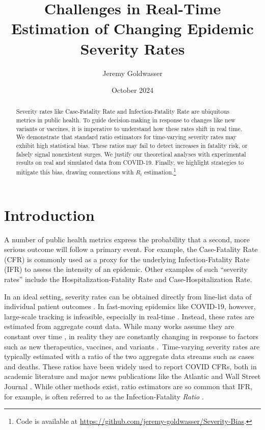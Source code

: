 \documentclass{article}
\title{Challenges in Real-Time Estimation of Changing Epidemic Severity Rates}
\author{Jeremy Goldwasser}
\date{October 2024}
\begin{document}
\maketitle
\begin{abstract}
    Severity rates like Case-Fatality Rate and Infection-Fatality Rate are ubiquitous metrics in public health. To guide decision-making in response to changes like new variants or vaccines, it is imperative to understand how these rates shift in real time. We demonstrate that standard ratio estimators for time-varying severity rates may exhibit high statistical bias. These ratios may fail to detect increases in fatality risk, or falsely signal nonexistent surges. We justify our theoretical analyses with experimental results on real and simulated data from COVID-19. Finally, we highlight strategies to mitigate this bias, drawing connections with $R_t$ estimation.\footnote{Code is available at \url{https://github.com/jeremy-goldwasser/Severity-Bias}.}
\end{abstract}
\section{Introduction}

A number of public health metrics express the probability that a second, more serious outcome will follow a primary event. For example, the Case-Fatality Rate (CFR) is commonly used as a proxy for the underlying Infection-Fatality Rate (IFR) to assess the intensity of an epidemic. Other examples of such “severity rates” include the Hospitalization-Fatality Rate and Case-Hospitalization Rate. 

In an ideal setting, severity rates can be obtained directly from line-list data of individual patient outcomes \cite{HFR_line_list1,HFR_linelist2,HFR_linelist3,cfr_line_list}. In fast-moving epidemics like COVID-19, however, large-scale tracking is infeasible, especially in real-time \cite{UKpaper}. Instead, these rates are estimated from aggregate count data. While many works assume they are constant over time \cite{reich2012estimating,ghani,jewell2007nonparametric,lancet_controversial}, in reality they are constantly changing in response to factors such as new therapeutics, vaccines, and variants \cite{nyt}. Time-varying severity rates are typically estimated with a ratio of the two aggregate data streams such as cases and deaths. These ratios have been widely used to report COVID CFRs, both in academic literature \cite{germany,horita2022global,timevar_ifr,yuan2020monitoring,LIU2023100350} and major news publications like the Atlantic \cite{atlantic} and Wall Street Journal \cite{wsj}. While other methods exist, ratio estimators are so common that IFR, for example, is often referred to as the Infection-Fatality \textit{Ratio} \cite{timevar_ifr, lancet_ifr}.
\end{document}
